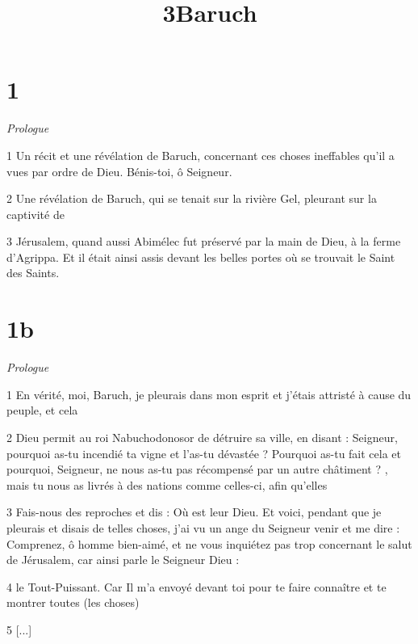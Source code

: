 

\title{3Baruch}

\chapter{1}

\par \textit{Prologue}

\par 1 Un récit et une révélation de Baruch, concernant ces choses ineffables qu'il a vues par ordre de Dieu. Bénis-toi, ô Seigneur.

\par 2 Une révélation de Baruch, qui se tenait sur la rivière Gel, pleurant sur la captivité de

\par 3 Jérusalem, quand aussi Abimélec fut préservé par la main de Dieu, à la ferme d'Agrippa. Et il était ainsi assis devant les belles portes où se trouvait le Saint des Saints.

\chapter{1b}

\par \textit{Prologue}

\par 1 En vérité, moi, Baruch, je pleurais dans mon esprit et j'étais attristé à cause du peuple, et cela

\par 2 Dieu permit au roi Nabuchodonosor de détruire sa ville, en disant : Seigneur, pourquoi as-tu incendié ta vigne et l'as-tu dévastée ? Pourquoi as-tu fait cela et pourquoi, Seigneur, ne nous as-tu pas récompensé par un autre châtiment ? , mais tu nous as livrés à des nations comme celles-ci, afin qu'elles

\par 3 Fais-nous des reproches et dis : Où est leur Dieu. Et voici, pendant que je pleurais et disais de telles choses, j'ai vu un ange du Seigneur venir et me dire : Comprenez, ô homme bien-aimé, et ne vous inquiétez pas trop concernant le salut de Jérusalem, car ainsi parle le Seigneur Dieu :

\par 4 le Tout-Puissant. Car Il m'a envoyé devant toi pour te faire connaître et te montrer toutes (les choses)

\par 5 [...]

